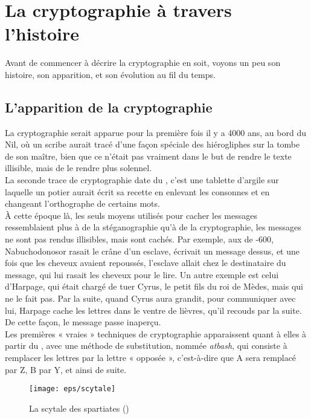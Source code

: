 \chapter{La cryptographie à travers l'histoire}
Avant de commencer à décrire la cryptographie en soit, voyons un peu
son histoire, son apparition, et son évolution au fil du temps.

\section{L'apparition de la cryptographie}
La cryptographie serait apparue pour la première fois il y a 4000 ans,
au bord du Nil, où un scribe aurait tracé d'une façon spéciale des
hiérogliphes sur la tombe de son maître, bien que ce n'était pas
vraiment dans le but de rendre le texte illisible, mais de le rendre
plus solennel. \\

La seconde trace de cryptographie date du , c'est une tablette
d'argile sur laquelle un potier aurait écrit sa recette en enlevant
les consonnes et en changeant l'orthographe de certains mots. \\

À cette époque là, les seuls moyens utilisés pour cacher les messages
ressemblaient plus à de la stéganographie qu'à de la cryptographie,
les messages ne sont pas rendus illisibles, mais sont cachés. Par
exemple, aux de -600, Nabuchodonosor rasait le crâne d'un esclave,
écrivait un message dessus, et une fois que les cheveux avaient
repoussés, l'esclave allait chez le destinataire du message, qui lui
rasait les cheveux pour le lire. Un autre exemple est celui d'Harpage,
qui était chargé de tuer Cyrus, le petit fils du roi de Mèdes, mais
qui ne le fait pas. Par la suite, quand Cyrus aura grandit, pour
communiquer avec lui, Harpage cache les lettres dans le ventre de
lièvres, qu'il recouds par la suite. De cette façon, le message passe
inaperçu. \\

Les premières « vraies » techniques de cryptographie apparaissent
quant à elles à partir du , avec une méthode de substitution,
nommée \emph{atbash}, qui consiste à remplacer les lettres par la
lettre « opposée », c'est-à-dire que A sera remplacé par Z, B par Y,
et ainsi de suite. \\

\begin{figure}[h]
  \begin{center}
    \texttt{[image: eps/scytale]}
  \end{center}
  \caption{La scytale des spartiates ()}
  \label{fig:Scytale}
\end{figure}
  
